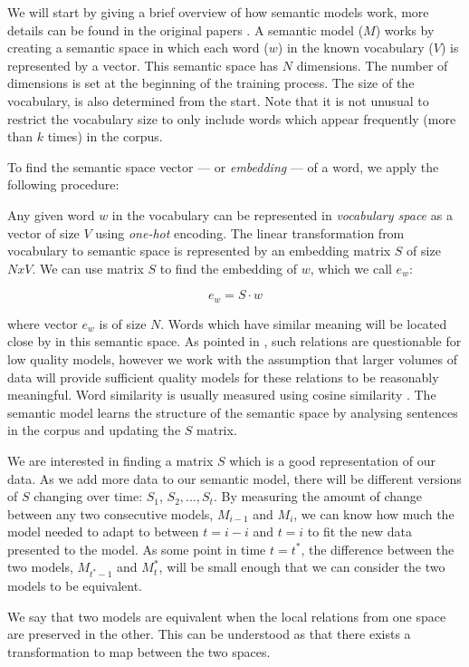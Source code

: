 \documentclass{article} %
\begin{document}
We will start by giving a brief overview of how semantic models work, more details can be found in the original papers \cite{Mikolov_CS2013}. A semantic model ($M$) works by creating a semantic space in which each word ($w$) in the known vocabulary ($V$) is represented by a vector. This semantic space has $N$ dimensions. The number of dimensions is set at the beginning of the training process. The size of the vocabulary, is also determined from the start. Note that it is not unusual to restrict the vocabulary size to only include words which appear frequently (more than $k$ times) in the corpus.

To find the semantic space vector --- or \textit{embedding} --- of a word, we apply the following procedure:

Any given word $w$ in the vocabulary can be represented in \textit{vocabulary space} as a vector of size $V$ using \textit{one-hot} encoding. The linear transformation from vocabulary to semantic space is represented by an embedding matrix $S$ of size $NxV$. We can use matrix $S$ to find the embedding of $w$, which we call $e_w$:

$$e_w = S \cdot w$$

where vector $e_w$ is of size $N$. Words which have similar meaning will be located close by in this semantic space. As pointed in \cite{Hellrich_COLING2016}, such relations are questionable for low quality models, however we work with the assumption that larger volumes of data will provide sufficient quality models for these relations to be reasonably meaningful. Word similarity is usually measured using cosine similarity \cite{Kim_CoRR2014}. The semantic model learns the structure of the semantic space by analysing sentences in the corpus and updating the $S$ matrix.

We are interested in finding a matrix $S$ which is a good representation of our data. As we add more data to our semantic model, there will be different versions of $S$ changing over time: $S_1$, $S_2, ..., S_t$. By measuring the amount of change between any two consecutive models, $M_{i-1}$ and $M_i$, we can know how much the model needed to adapt to between $t=i-i$ and $t=i$ to fit the new data presented to the model. As some point in time $t=t^\ast$, the difference between the two models, $M_{t^\ast-1}$ and $M_t^\ast$, will be small enough that we can consider the two models to be equivalent.

We say that two models are equivalent when the local relations from one space are preserved in the other. This can be understood as that there exists a transformation to map between the two spaces.
\end{document}
